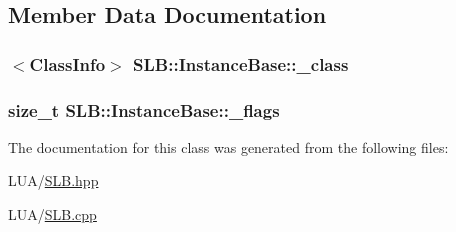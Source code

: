\subsection{Member Data Documentation}
\subsubsection[{\texorpdfstring{\+\_\+class}{_class}}]{$<${\bf Class\+Info}$>$ S\+L\+B\+::\+Instance\+Base\+::\+\_\+class\hspace{0.3cm}{\ttfamily [protected]}}\hypertarget{classSLB_1_1InstanceBase_acb55084c9fe2f70d817f1a493fc09109}{}\label{classSLB_1_1InstanceBase_acb55084c9fe2f70d817f1a493fc09109}
\subsubsection[{\texorpdfstring{\+\_\+flags}{_flags}}]{\setlength{\rightskip}{0pt plus 5cm}size\+\_\+t S\+L\+B\+::\+Instance\+Base\+::\+\_\+flags\hspace{0.3cm}{\ttfamily [protected]}}\hypertarget{classSLB_1_1InstanceBase_ae5ea147e7c548f9cd0f44884ed0a3c40}{}\label{classSLB_1_1InstanceBase_ae5ea147e7c548f9cd0f44884ed0a3c40}


The documentation for this class was generated from the following files\+:\begin{DoxyCompactItemize}
\item 
L\+U\+A/\hyperlink{SLB_8hpp}{S\+L\+B.\+hpp}\item 
L\+U\+A/\hyperlink{SLB_8cpp}{S\+L\+B.\+cpp}\end{DoxyCompactItemize}
